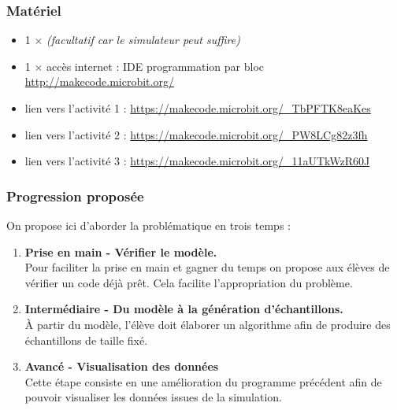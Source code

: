 \subsubsection{Matériel}
\begin{itemize}
    \item 1 $\times$ \matosMb \emph{(facultatif car le simulateur peut suffire)}
    \item 1 $\times$ accès internet : IDE programmation par bloc \url{http://makecode.microbit.org/}
    \item lien vers l'activité 1 : \url{https://makecode.microbit.org/_TbPFTK8eaKes}
    \item lien vers l'activité 2 : \url{https://makecode.microbit.org/_PW8LCg82z3fh}
    \item lien vers l'activité 3 :
    \url{https://makecode.microbit.org/_11aUTkWzR60J}
\end{itemize}

\newpage

\subsubsection{Progression proposée}


\begin{methode}
    On propose ici d'aborder la problématique en trois temps :

    \begin{enumerate}
        \item \textbf{Prise en main - Vérifier le modèle.} \\
            Pour faciliter la prise en main et gagner du temps on propose aux élèves de vérifier un code déjà prêt. Cela facilite l'appropriation du problème.
        \item \textbf{Intermédiaire - Du modèle à la génération d'échantillons.}\\
            À partir du modèle, l'élève doit élaborer un algorithme afin de produire des échantillons de taille fixé.
        \item \textbf{Avancé - Visualisation des données}\\
            Cette étape consiste en une amélioration du programme précédent afin de pouvoir visualiser les données issues de la simulation.

    \end{enumerate}
\end{methode}

